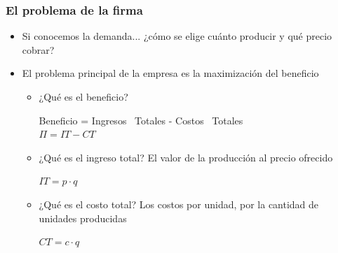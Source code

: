 \documentclass{beamer}
\begin{document}
\begin{frame}
    \frametitle{El problema de la firma}
    \begin{itemize}
        \item Si conocemos la demanda... ¿cómo se elige cuánto producir y qué precio cobrar?
        \vspace{2mm}
        \item El problema principal de la empresa es la maximización del beneficio \vspace{2mm} 
            \begin{itemize}
            \item ¿Qué es el beneficio? \vspace{2mm}  
                \begin{center}
                Beneficio = Ingresos \ Totales - Costos \ Totales \\  \vspace{2mm}
                $\Pi = IT - CT $ 
                \end{center}
                \vspace{2mm}
            \item ¿Qué es el ingreso total?  
            El valor de la producción al precio ofrecido \\ \vspace{1mm} 
                \begin{center}
                $IT = p \cdot q$
                \end{center}
            \vspace{2mm}
            \item ¿Qué es el costo total?
            Los costos por unidad, por la cantidad de unidades producidas \\ \vspace{1mm} 
                \begin{center}
                $CT = c \cdot q$
                \end{center}
        \end{itemize} 
    \end{itemize} 
\end{frame}
\end{document}
